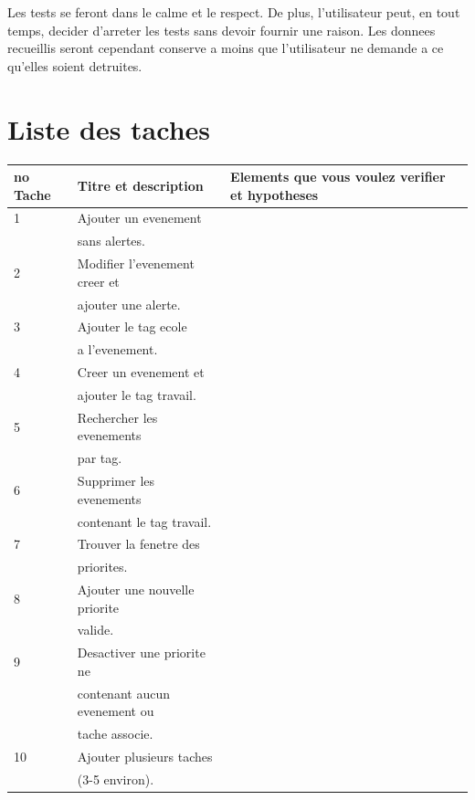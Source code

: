 \documentclass[letterpaper, oneside, 12pt, these, creativecommons]{thETS}
\begin{document}
Les tests se feront dans le calme et le respect. De plus, l'utilisateur peut, en tout temps, decider d'arreter les tests sans devoir fournir une raison. Les donnees recueillis seront cependant conserve a moins que l'utilisateur ne demande a ce qu'elles soient detruites.

\newpage

\section{Liste des taches}

\begin{table}
	\centering
	\begin{tabular}{|l|l|l|}
		\hline
		no Tache	& Titre et description		& Elements que vous voulez verifier et hypotheses 	\\ \hline 
		1		& Ajouter un evenement		&  							\\ 
				& sans alertes.			&							\\ \hline
		2		& Modifier l'evenement creer et	&							\\
				& ajouter une alerte.		&							\\ \hline
		3		& Ajouter le tag ecole		&							\\
				& a l'evenement.			&							\\ \hline
		4		& Creer un evenement et		&							\\
				& ajouter le tag travail.		&							\\ \hline
		5		& Rechercher les evenements	& 							\\
				& par tag.				&							\\ \hline
		6		& Supprimer les evenements	&							\\
				& contenant le tag travail.		&							\\ \hline
		7		& Trouver la fenetre des		&							\\
				& priorites.				& 							\\ \hline
		8		& Ajouter une nouvelle priorite 	&							\\
				& valide.				&							\\ \hline
		9		& Desactiver une priorite ne	&							\\
				& contenant aucun evenement ou &							\\
				& tache associe.			&							\\ \hline
		10		& Ajouter plusieurs taches		&							\\
				& (3-5 environ).			&							\\ \hline

\end{tabular}
\end{table}
\end{document}
